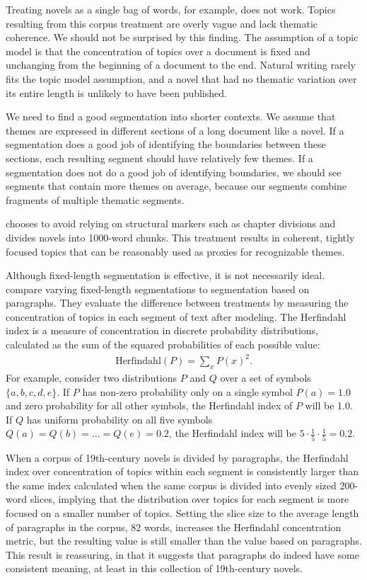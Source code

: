Treating novels as a single bag of words, for example, does not work.
Topics resulting from this corpus treatment are overly vague and lack thematic coherence.
We should not be surprised by this finding.
The assumption of a topic model is that the concentration of topics over a document is fixed and unchanging from the beginning of a document to the end.
Natural writing rarely fits the topic model assumption, and a novel that had no thematic variation over its entire length is unlikely to have been published.

We need to find a good segmentation into shorter contexts.
We assume that themes are expressed in different sections of a long document like a novel.
If a segmentation does a good job of identifying the boundaries between these sections, each resulting segment should have relatively few themes.
If a segmentation does not do a good job of identifying boundaries, we should see segments that contain more themes on average, because our segments combine fragments of multiple thematic segments.

 \citet{jockers-13} chooses to avoid relying on structural markers such as chapter divisions and divides novels into 1000-word chunks.
This treatment results in coherent, tightly focused topics that can be reasonably used as proxies for recognizable themes.

Although fixed-length segmentation is effective, it is not necessarily ideal.
\citet{algeehewitt2015paragraphs} compare varying fixed-length segmentations to segmentation based on paragraphs.
They evaluate the difference between treatments by measuring the concentration of topics in each segment of text after modeling.
The Herfindahl index is a measure of concentration in discrete probability distributions, calculated as the sum of the squared probabilities of each possible value:
\begin{align}
\text{Herfindahl}(P) = \sum_x P(x)^2.
\end{align}
For example, consider two distributions $P$ and $Q$ over a set of symbols $\{a, b, c, d, e\}$.
If $P$ has non-zero probability only on a single symbol $P(a) = 1.0$ and zero probability for all other symbols, the Herfindahl index of $P$ will be 1.0.
If $Q$ has uniform probability on all five symbols $Q(a) = Q(b) = ... = Q(e) = 0.2$, the Herfindahl index will be $5 \cdot \frac{1}{5} \cdot \frac{1}{5} = 0.2$.

When a corpus of 19th-century novels is divided by paragraphs, the Herfindahl index over concentration of topics within each segment is consistently larger than the same index calculated when the same corpus is divided into evenly sized 200-word slices, implying that the distribution over topics for each segment is more focused on a smaller number of topics.
Setting the slice size to the average length of paragraphs in the corpus, 82 words, increases the Herfindahl concentration metric, but the resulting value is still smaller than the value based on paragraphs.
This result is reassuring, in that it suggests that paragraphs do indeed have some consistent meaning, at least in this collection of 19th-century novels.

